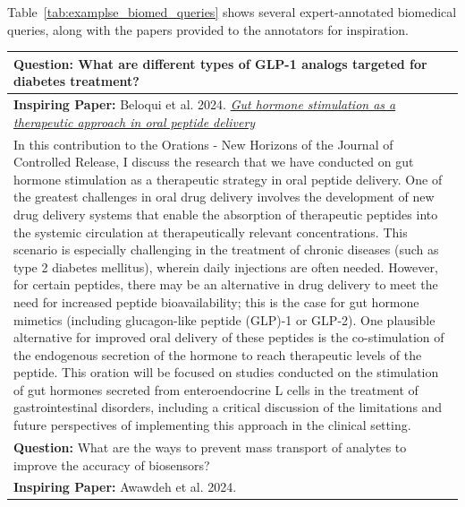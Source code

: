 Table~\ref{tab:examplse_biomed_queries} shows several expert-annotated biomedical queries, along with the papers provided to the annotators for inspiration. 
\begin{table}[t!]
\renewcommand{\arraystretch}{1.2}
\setlength{\tabcolsep}{2pt}
\footnotesize
    \centering
    \begin{tabular}{p{14cm}}%
\toprule
{\bf Question:} What are different types of GLP-1 analogs targeted for diabetes treatment? \\\midrule
{\bf Inspiring Paper:} Beloqui et al. 2024. {\it \href{https://www.semanticscholar.org/paper/Gut-hormone-stimulation-as-a-therapeutic-approach-Beloqui/cf16178ff26101844ca3694bd7cf07777be9e05f?utm_source=direct_link}{Gut hormone stimulation as a therapeutic approach in oral peptide delivery} } \\
In this contribution to the Orations - New Horizons of the Journal of Controlled Release, I discuss the research that we have conducted on gut hormone stimulation as a therapeutic strategy in oral peptide delivery. One of the greatest challenges in oral drug delivery involves the development of new drug delivery systems that enable the absorption of therapeutic peptides into the systemic circulation at therapeutically relevant concentrations. This scenario is especially challenging in the treatment of chronic diseases (such as type 2 diabetes mellitus), wherein daily injections are often needed. However, for certain peptides, there may be an alternative in drug delivery to meet the need for increased peptide bioavailability; this is the case for gut hormone mimetics (including glucagon-like peptide (GLP)-1 or GLP-2). One plausible alternative for improved oral delivery of these peptides is the co-stimulation of the endogenous secretion of the hormone to reach therapeutic levels of the peptide. This oration will be focused on studies conducted on the stimulation of gut hormones secreted from enteroendocrine L cells in the treatment of gastrointestinal disorders, including a critical discussion of the limitations and future perspectives of implementing this approach in the clinical setting.  \\
\bottomrule
{\bf Question:}  
What are the ways to prevent mass transport of analytes to improve the accuracy of biosensors?\\\midrule
{\bf Inspiring Paper:} Awawdeh et al. 2024. {\it \href{https://www.semanticscholar.org/paper/Enhancing-the-performance-of-porous-silicon-the-of-Awawdeh-Buttkewitz/5107c9de9413c4da364078bd9592ef2aa3c5a332?utm_source=direct_link}{
}}
\end{tabular}
\end{table}
